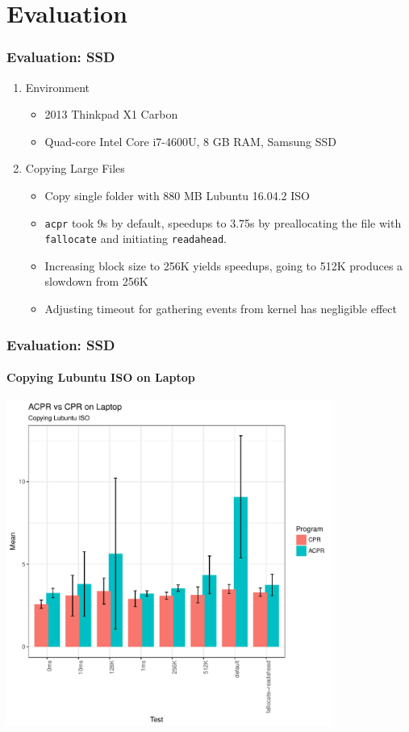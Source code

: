 \documentclass{beamer}
\begin{document}
\section{Evaluation}
\begin{frame}
\frametitle{Evaluation: SSD}
\begin{enumerate}[1.]
	\item{Environment}
	\begin{itemize}
		\item 2013 Thinkpad X1 Carbon
		\item Quad-core Intel Core i7-4600U, 8 GB RAM, Samsung SSD
	\end{itemize}
	\item{Copying Large Files}
	\begin{itemize}
		\item Copy single folder with 880 MB Lubuntu 16.04.2 ISO
		\item \texttt{acpr} took 9s by default, speedups to 3.75s by preallocating the file with \texttt{fallocate} and initiating \texttt{readahead}.
		\item Increasing block size to 256K yields speedups, going to 512K produces a slowdown from 256K
		\item Adjusting timeout for gathering events from kernel has negligible effect
	\end{itemize}
\end{enumerate}
\end{frame}

\begin{frame}
    \frametitle{Evaluation: SSD}
    \framesubtitle{Copying Lubuntu ISO on Laptop}
    \centering
    \includegraphics[width=0.8\textwidth,height=0.8\textheight,]{Laptop_Lubuntu_Barplot.pdf}
\end{frame}
\end{document}
